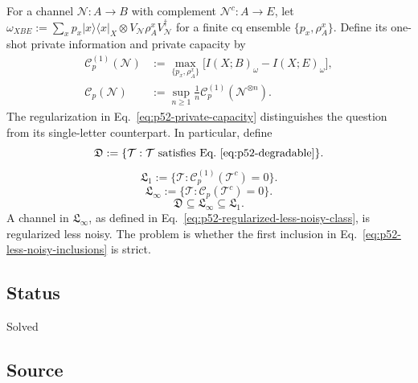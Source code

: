 For a channel $\mathcal N:A\to B$ with complement $\mathcal N^c:A\to E$,
let
$\omega_{XBE}:=\sum_x p_x\lvert x\rangle\!\langle x\rvert_X\otimes
V_{\mathcal N}\rho_A^xV_{\mathcal N}^\dagger$ for a finite cq ensemble
$\{p_x,\rho_A^x\}$.  Define its one-shot private information and private
capacity by
\begin{equation}
  \begin{aligned}
    \mathcal C_p^{(1)}(\mathcal N)
      &:=\max_{\{p_x,\rho_A^x\}}
          \bigl[I(X;B)_\omega-I(X;E)_\omega\bigr],\\
    \mathcal C_p(\mathcal N)
      &:=\sup_{n\ge1}\frac1n
          \mathcal C_p^{(1)}(\mathcal N^{\otimes n}).
  \end{aligned}
  \label{eq:p52-private-capacity}
\end{equation}
The regularization in Eq.~\eqref{eq:p52-private-capacity} distinguishes the
question from its single-letter counterpart.  In particular, define
\begin{equation}
  \mathfrak D
    :=\{\mathcal T:\mathcal T\text{ satisfies
        Eq.~\eqref{eq:p52-degradable}}\}.
  \label{eq:p52-degradable-class}
\end{equation}
\begin{equation}
  \mathfrak L_1
    :=\{\mathcal T:\mathcal C_p^{(1)}(\mathcal T^c)=0\}.
  \label{eq:p52-one-shot-less-noisy-class}
\end{equation}
\begin{equation}
  \mathfrak L_\infty
    :=\{\mathcal T:\mathcal C_p(\mathcal T^c)=0\}.
  \label{eq:p52-regularized-less-noisy-class}
\end{equation}
\begin{equation}
  \mathfrak D\subseteq\mathfrak L_\infty\subseteq\mathfrak L_1.
  \label{eq:p52-less-noisy-inclusions}
\end{equation}
A channel in $\mathfrak L_\infty$, as defined in
Eq.~\eqref{eq:p52-regularized-less-noisy-class}, is regularized less noisy.
The problem is whether the first inclusion in
Eq.~\eqref{eq:p52-less-noisy-inclusions} is strict.

\subsection*{Status}

Solved

\subsection*{Source}

